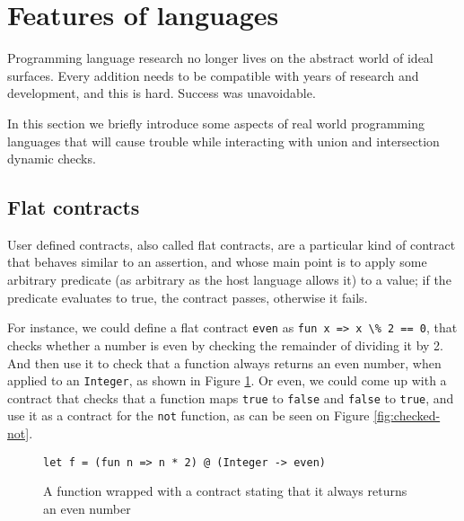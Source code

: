 \documentclass[sigplan,10pt,review,anonymous]{acmart}
\newcommand{\unsure}[2][1=]{}
\newcommand{\info}[2][1=]{}
\newcommand{\nickel}[1]{\lstinline[language=nickel]{#1}}
\begin{document}
\section{Features of languages}
\info{Zoology of various features that we will eventually show
  conflict with this or that property or implementation of union and
  intersection. Including user-define contracts.}

Programming language research no longer lives on the abstract world
of ideal surfaces.
Every addition needs to be compatible with years of research
and development, and this is hard.
Success was unavoidable.

In this section we briefly introduce some aspects of real world
programming languages that will cause trouble while interacting
with union and intersection dynamic checks.

\subsection*{Flat contracts}
\label{sec:flat-contracts}

\unsure{Should we define contracts prior to this?}
User defined contracts, also called flat contracts, are a particular
kind of contract that behaves similar to an assertion, and whose
main point is to apply some arbitrary predicate (as arbitrary as the
host language allows it) to a value; if the predicate evaluates to
true, the contract passes, otherwise it fails.

For instance, we could define a flat contract \nickel{even} as
\nickel{fun x => x \% 2 == 0}, that checks
whether a number is even by checking the remainder of dividing it by 2.
And then use it to check that a function always returns an
even number, when applied to an \nickel{Integer}, as shown in
Figure \ref{fig:num-to-even}.
Or even, we could come up with a contract that checks that a function
maps \nickel{true} to \nickel{false} and \nickel{false} to \nickel{true},
and use it as a contract for the \nickel{not} function, as can be seen on Figure
\ref{fig:checked-not}.

\begin{figure}[h]
\begin{center}
\begin{lstlisting}[language=nickel]
let f = (fun n => n * 2) @ (Integer -> even)
\end{lstlisting}
  \end{center}
\caption{A function wrapped with a contract stating that it always returns
an even number}
\label{fig:num-to-even}
\end{figure}
\end{document}
